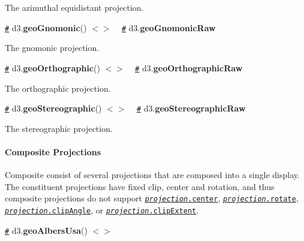 \href{https://bl.ocks.org/mbostock/3757110}{\tt }

The azimuthal equidistant projection.

\href{#geoGnomonic}{\tt \#} d3.{\bfseries geo\+Gnomonic}() \href{https://github.com/d3/d3-geo/blob/master/src/projection/gnomonic.js}{\tt $<$$>$} ~\newline
\href{#geoGnomonicRaw}{\tt \#} d3.{\bfseries geo\+Gnomonic\+Raw}

\href{https://bl.ocks.org/mbostock/3757349}{\tt }

The gnomonic projection.

\href{#geoOrthographic}{\tt \#} d3.{\bfseries geo\+Orthographic}() \href{https://github.com/d3/d3-geo/blob/master/src/projection/orthographic.js}{\tt $<$$>$} ~\newline
\href{#geoOrthographicRaw}{\tt \#} d3.{\bfseries geo\+Orthographic\+Raw}

\href{https://bl.ocks.org/mbostock/3757125}{\tt }

The orthographic projection.

\href{#geoStereographic}{\tt \#} d3.{\bfseries geo\+Stereographic}() \href{https://github.com/d3/d3-geo/blob/master/src/projection/stereographic.js}{\tt $<$$>$} ~\newline
\href{#geoStereographicRaw}{\tt \#} d3.{\bfseries geo\+Stereographic\+Raw}

\href{https://bl.ocks.org/mbostock/3757137}{\tt }

The stereographic projection.

\paragraph*{Composite Projections}

Composite consist of several projections that are composed into a single display. The constituent projections have fixed clip, center and rotation, and thus composite projections do not support \href{#projection_center}{\tt {\itshape projection}.center}, \href{#projection_rotate}{\tt {\itshape projection}.rotate}, \href{#projection_clipAngle}{\tt {\itshape projection}.clip\+Angle}, or \href{#projection_clipExtent}{\tt {\itshape projection}.clip\+Extent}.

\href{#geoAlbersUsa}{\tt \#} d3.{\bfseries geo\+Albers\+Usa}() \href{https://github.com/d3/d3-geo/blob/master/src/projection/albersUsa.js}{\tt $<$$>$}

\href{https://bl.ocks.org/mbostock/4090848}{\tt }

